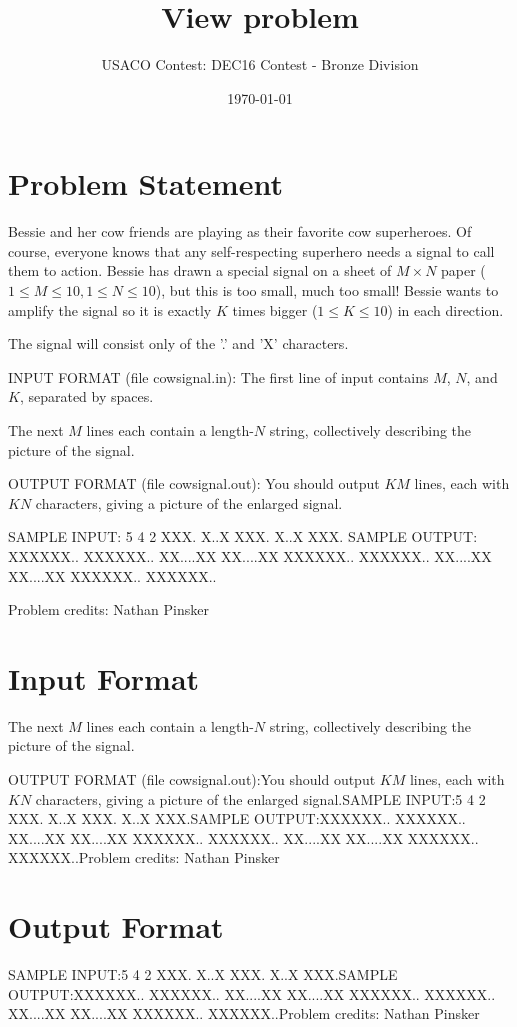 \documentclass[12pt]{article}
\title{View problem}
\author{USACO Contest: DEC16 Contest - Bronze Division}
\date{\today}
\begin{document}
\maketitle

\section*{Problem Statement}

Bessie and her cow friends are playing as their favorite cow superheroes.  Of
course, everyone knows that any self-respecting superhero needs a signal to call
them to action. Bessie has drawn a special signal on a sheet of $M \times N$
paper ($1 \leq M \leq 10, 1 \leq N \leq 10$), but this is too small, much too
small! Bessie wants to amplify the signal so it is exactly $K$ times bigger
($1 \leq K \leq 10$) in each direction.

The signal will consist only of the '.' and 'X' characters.

INPUT FORMAT (file cowsignal.in):
The first line of input contains $M$, $N$, and $K$, separated by spaces.  

The next $M$ lines each contain a length-$N$ string, collectively describing the
picture of the signal.

OUTPUT FORMAT (file cowsignal.out):
You should output $KM$ lines, each with $KN$ characters, giving a picture of the
enlarged signal.

SAMPLE INPUT:
5 4 2
XXX.
X..X
XXX.
X..X
XXX.
SAMPLE OUTPUT: 
XXXXXX..
XXXXXX..
XX....XX
XX....XX
XXXXXX..
XXXXXX..
XX....XX
XX....XX
XXXXXX..
XXXXXX..


Problem credits: Nathan Pinsker



\section*{Input Format}
The next $M$ lines each contain a length-$N$ string, collectively describing the
picture of the signal.

OUTPUT FORMAT (file cowsignal.out):You should output $KM$ lines, each with $KN$ characters, giving a picture of the
enlarged signal.SAMPLE INPUT:5 4 2
XXX.
X..X
XXX.
X..X
XXX.SAMPLE OUTPUT:XXXXXX..
XXXXXX..
XX....XX
XX....XX
XXXXXX..
XXXXXX..
XX....XX
XX....XX
XXXXXX..
XXXXXX..Problem credits: Nathan Pinsker

\section*{Output Format}
SAMPLE INPUT:5 4 2
XXX.
X..X
XXX.
X..X
XXX.SAMPLE OUTPUT:XXXXXX..
XXXXXX..
XX....XX
XX....XX
XXXXXX..
XXXXXX..
XX....XX
XX....XX
XXXXXX..
XXXXXX..Problem credits: Nathan Pinsker
\end{document}
